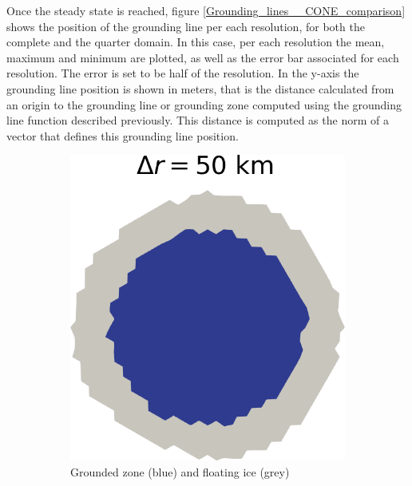 \documentclass{article}
\begin{document}
Once the steady state is reached, figure \ref{Grounding_lines__CONE_comparison} shows the position of the grounding line per each resolution, for both the complete and the quarter domain. In this case, per each resolution the mean, maximum and minimum are plotted, as well as the error bar associated for each resolution. The error is set to be half of the resolution. In the y-axis the grounding line position is shown in meters, that is the distance calculated from an origin to the grounding line or grounding zone computed using the grounding line function described previously. This distance is computed as the norm of a vector that defines this grounding line position.  

\begin{figure}[!h]
	\centering %
	\begin{subfigure}{0.25\textwidth}
		\includegraphics[width=\linewidth]{../fig/Grounded_zone_50km_CONE.png}
		\caption{Grounded zone (blue) and floating ice (grey)}
		\label{figCONE50KM}
	\end{subfigure}\hfil %
	\begin{subfigure}{0.25\textwidth}

\end{subfigure}
\end{figure}
\end{document}
